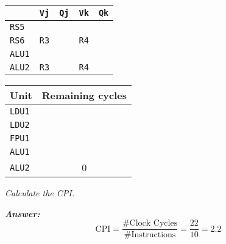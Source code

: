 \begin{enumerate}
    \begin{minipage}{0.45\textwidth}
        \centering
        \begin{tabular}{@{} l | l l l l @{}}
            \toprule
            & \texttt{Vj} & \texttt{Qj} & \texttt{Vk} & \texttt{Qk} \\
            \midrule
            \texttt{RS5} & & & & \\ [.3em]
            \texttt{RS6} & \texttt{R3} & & \texttt{R4} & \\
            \cmidrule{1-5}
            \texttt{ALU1} & & & & \\ [.3em]
            \texttt{ALU2} & \texttt{R3} & & \texttt{R4} & \\
            \bottomrule
        \end{tabular}
    \end{minipage}
    \hfill
    \begin{minipage}{0.45\textwidth}
        \centering
        \begin{tabular}{@{} l c @{}}
            \toprule
            Unit            & Remaining cycles \\
            \midrule
            \texttt{LDU1}   & \\ [.3em]
            \texttt{LDU2}   & \\ [.3em]
            \texttt{FPU1}   & \\ [.3em]
            \texttt{ALU1}   & \\ [.3em]
            \texttt{ALU2}   & 0 \\
            \bottomrule
        \end{tabular}
    \end{minipage}
\end{enumerate}
\emph{Calculate the CPI.}

\highspace
\textcolor{Green3}{\textbf{\emph{Answer:}}}
\begin{equation*}
    \text{CPI} = \dfrac{\text{\# Clock Cycles}}{\text{\# Instructions}} = \dfrac{22}{10} = 2.2
\end{equation*}